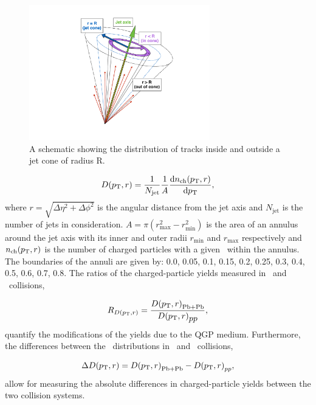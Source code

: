 \begin{figure}[htbp]
\centering
\includegraphics[width=0.7\textwidth]{figures/main/general/cartoon_dptr}
\caption{A schematic showing the distribution of tracks inside and outside a jet cone of radius R.}
\label{fig:cartoon_dptr}
\end{figure}


\begin{align}
\mbox{$D( \mbox{$p_{\mathrm{T}}$}, r)$} = \frac{1}{N_{\mathrm{jet}}} \frac{1}{A} \frac{\mathrm{d} n_{\mathrm{ch}} (\mbox{$p_{\mathrm{T}}$}, r)}{\mathrm{d} \mbox{$p_{\mathrm{T}}$}},
\end{align}
where $r = \sqrt{\Delta \eta^2 + \Delta \phi^2}$ is the angular distance from the jet axis and $N_{\mathrm{jet}}$ is the number of jets in consideration.
$A = \pi (r_{\mathrm{max}}^2 - r_{\mathrm{min}}^2) $ is the area of an annulus around the jet axis with its inner and outer radii $r_{\mathrm{min}}$ and $r_{\mathrm{max}}$ respectively and $n_{\mathrm{ch}}(\mbox{$p_{\mathrm{T}}$}, r)$ is the number of charged particles with a given \pt\ within the annulus.
The boundaries of the annuli are given by: 0.0, 0.05, 0.1, 0.15, 0.2, 0.25, 0.3, 0.4, 0.5, 0.6, 0.7, 0.8.
The ratios of the charged-particle yields measured in \pbpb\ and \pp\ collisions,

\begin{align}
   \mbox{$R_{D( p_{\mathrm{T}}, r)}$} = \frac{\mbox{$D( \mbox{$p_{\mathrm{T}}$}, r)$}_\mathrm{Pb+Pb}}{\mbox{$D( \mbox{$p_{\mathrm{T}}$}, r)$}_{\mbox{$pp$}}},
\end{align}
quantify the modifications of the yields due to the QGP medium.
Furthermore, the differences between the \Dptr\ distributions in \pbpb\ and \pp\ collisions, 

\begin{align}
   \Delta \mbox{$D( \mbox{$p_{\mathrm{T}}$}, r)$} = \mbox{$D( \mbox{$p_{\mathrm{T}}$}, r)$}_\mathrm{Pb+Pb} - \mbox{$D( \mbox{$p_{\mathrm{T}}$}, r)$}_{pp},
\end{align}
allow for measuring the absolute differences in charged-particle yields between the two collision systems.

